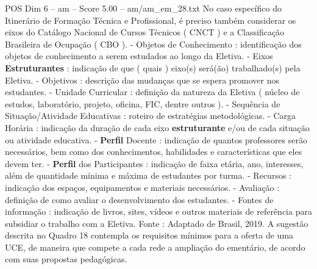 \begin{textsample}{POS Dim 6 – am – Score 5.00 – am/am\_em\_28.txt}
No caso específico do Itinerário de Formação Técnica e Profissional, é preciso também considerar os eixos do Catálogo Nacional de Cursos Técnicos ( CNCT ) e a Classificação Brasileira de Ocupação ( CBO ). - Objetos de Conhecimento : identificação dos objetos de conhecimento a serem estudados ao longo da Eletiva. - Eixos \textbf{Estruturantes} : indicação de que ( quais ) eixo(s) será(ão) trabalhado(s) pela Eletiva. - Objetivos : descrição das mudanças que se espera promover nos estudantes. - Unidade Curricular : definição da natureza da Eletiva ( núcleo de estudos, laboratório, projeto, oficina, FIC, dentre outros ). - Sequência de Situação/Atividade Educativas : roteiro de estratégias metodológicas. - Carga Horária : indicação da duração de cada eixo \textbf{estruturante} e/ou de cada situação ou atividade educativa. - \textbf{Perfil} Docente : indicação de quantos professores serão necessários, bem como dos conhecimentos, habilidades e características que eles devem ter. - \textbf{Perfil} dos Participantes : indicação de faixa etária, ano, interesses, além de quantidade mínima e máxima de estudantes por turma. - Recursos : indicação dos espaços, equipamentos e materiais necessários. - Avaliação : definição de como avaliar o desenvolvimento dos estudantes. - Fontes de informação : indicação de livros, sites, vídeos e outros materiais de referência para subsidiar o trabalho com a Eletiva.
Fonte : Adaptado de Brasil, 2019.
A sugestão descrita no Quadro 18 contempla os requisitos mínimos para a oferta de uma UCE, de maneira que compete a cada rede a ampliação do ementário, de acordo com suas propostas pedagógicas.

\end{textsample}
